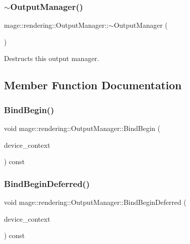 \subsubsection{\texorpdfstring{$\sim$\+Output\+Manager()}{~OutputManager()}}
{\footnotesize\ttfamily mage\+::rendering\+::\+Output\+Manager\+::$\sim$\+Output\+Manager (\begin{DoxyParamCaption}{ }\end{DoxyParamCaption})\hspace{0.3cm}{\ttfamily [default]}}

Destructs this output manager. 

\subsection{Member Function Documentation}
\mbox{\label{classmage_1_1rendering_1_1_output_manager_a9c753354655b7b218263832c343417d1}} 
\subsubsection{\texorpdfstring{Bind\+Begin()}{BindBegin()}}
{\footnotesize\ttfamily void mage\+::rendering\+::\+Output\+Manager\+::\+Bind\+Begin (\begin{DoxyParamCaption}\item[{I\+D3\+D11\+Device\+Context \&}]{device\+\_\+context }\end{DoxyParamCaption}) const\hspace{0.3cm}{\ttfamily [noexcept]}}

\mbox{\label{classmage_1_1rendering_1_1_output_manager_ad05f55888d2075806ae7a381031ecdfd}} 
\subsubsection{\texorpdfstring{Bind\+Begin\+Deferred()}{BindBeginDeferred()}}
{\footnotesize\ttfamily void mage\+::rendering\+::\+Output\+Manager\+::\+Bind\+Begin\+Deferred (\begin{DoxyParamCaption}\item[{I\+D3\+D11\+Device\+Context \&}]{device\+\_\+context }\end{DoxyParamCaption}) const\hspace{0.3cm}{\ttfamily [noexcept]}}


